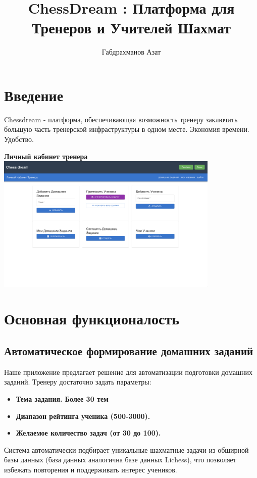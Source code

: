 \documentclass[a4paper,12pt]{article}
\title{ChessDream : Платформа для Тренеров и Учителей Шахмат}
\author{Габдрахманов Азат}
\date{}
\begin{document}
\maketitle
\tableofcontents
\newpage

\section{Введение}

Chessdream - платформа, обеспечивающая возможность тренеру заключить большую часть тренерской инфраструктуры в одном месте.
Экономия времени. Удобство.

\vspace{0.5cm}
\noindent
\begin{center}
    \textbf{Личный кабинет тренера}
      \includegraphics[width=0.8\textwidth]{chessdreampics/coachdashboard.png}
\end{center}
\vspace{0.5cm}

\section{Основная функционалость}

\subsection{Автоматическое формирование домашних заданий}
Наше приложение предлагает решение для автоматизации подготовки домашних заданий. Тренеру достаточно задать параметры:
\begin{itemize}
    \item \textbf{Тема задания. Более 30 тем}
    \item \textbf{Диапазон рейтинга ученика (500-3000).}
    \item \textbf{Желаемое количество задач (от 30 до 100).}
\end{itemize}
Система автоматически подбирает уникальные шахматные задачи из обширной базы данных (база данных аналогична базе данных Lichess), что позволяет избежать повторения и поддерживать интерес учеников.
\end{document}
